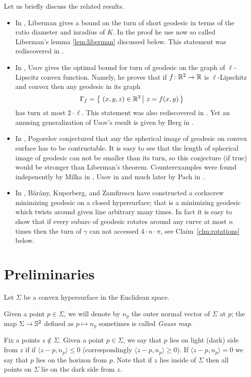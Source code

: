 \documentclass[a4paper,10pt]{amsart}
\begin{document}
Let us briefly discuss the related results.

\begin{itemize}
\item In \cite{liberman}, Liberman gives a bound on the turn of short geodesic in terms of the ratio diameter and inradius of $K$.
In the proof he use now so called Liberman's lemma \ref{lem:liberman} discussed below.
This statement was rediscovered in \cite{BKZ}.
\item In \cite{usov}, Usov gives the optimal bound for turn of geodesic on the graph of $\ell$-Lipscitz convex function. 
Namely, he proves that if $f\colon\mathbb{R}^2\to\mathbb{R}$ is $\ell$-Lipschitz and convex then any 
geodesic in its graph 
\[\Gamma_f=\set{(x,y,z)\in \RR^3}{z=f(x,y)}\] 
has turn at most $2\cdot \ell$.
This statement was also rediscovered in \cite{BKZ}.
Yet an amusing generalization of Usov's result is given by Berg in \cite{berg}.
\item In \cite{pogorelov}, Pogorelov conjectured that any the spherical image of geodesic on convex surface has to be contructable.
It is easy to see that the length of spherical image of geodesic can not be smaller than its turn, so this conjecture (if true) would be stronger than Liberman's theorem.
Counterexamples were found indepenently by Milka in \cite{milka}, 
Usov in \cite{usov-conj-pog} 
and much later by Pach in \cite{pach}.
\item In \cite{BKZ},
B{\'a}r{\'a}ny,
Kuperberg, 
and Zamfirescu 
have constructed a corkscrew minimizing geodesic on a closed hypersurface;
that is a minimizing geodesic which twists around given line arbitrary many times.
In fact it is easy to show that if every subarc of geodesic rotates around any curve at most $n$ times then the turn of $\gamma$ can not accessed $4\cdot n\cdot \pi$, see Claim~\ref{clm:rotations} below.
\end{itemize}


\section{Preliminaries}

Let $\Sigma$ be a convex hypersurface in the Euclidean space.

Given a point $p\in \Sigma$, we will denote by $n_p$ the outer normal vector of $\Sigma$ at $p$;
the map $\Sigma\to\mathbb{S}^2$ defined as $p\mapsto n_p$ sometimes is called \emph{Gauss map}.

Fix a points $z\notin\Sigma$.
Given a point $p\in \Sigma$,
we say that $p$ lies on light (dark) side from $z$ if 
if $\langle z-p,n_p\rangle\le 0$ (correspondingly $\langle z-p,n_p\rangle\ge 0$).
If $\langle z-p,n_p\rangle= 0$ we say that $p$ lies on the horizon
from $p$.
Note that if $z$ lies inside of $\Sigma$ then all points on $\Sigma$ lie on the dark side from $z$.
\end{document}
